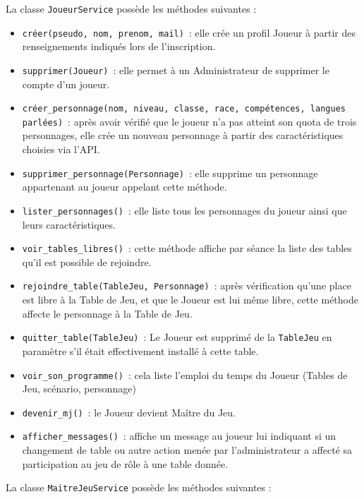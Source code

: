 \documentclass[11pt]{article}
\begin{document}
La classe \texttt{JoueurService} possède les méthodes suivantes :
\begin{itemize}[label=, font=\small]
    \item \texttt{créer(pseudo, nom, prenom, mail)}~: elle crée un profil Joueur à partir des renseignements indiqués lors de l'inscription.
    \item \texttt{supprimer(Joueur)}~: elle permet à un Administrateur de supprimer le compte d'un joueur.
    \item \texttt{créer\_personnage(nom, niveau, classe, race, compétences, langues parlées)}~: après avoir vérifié que le joueur n'a pas atteint son quota de trois personnages, elle crée un nouveau personnage à partir des caractéristiques choisies via l'API.
    \item \texttt{supprimer\_personnage(Personnage)}~: elle supprime un personnage appartenant au joueur appelant cette méthode.
    \item \texttt{lister\_personnages()}~: elle liste tous les personnages du joueur ainsi que leurs caractéristiques.
    \item \texttt{voir\_tables\_libres()}~: cette méthode affiche par séance la liste des tables qu'il est possible de rejoindre.
    \item \texttt{rejoindre\_table(TableJeu, Personnage)}~: après vérification qu'une place est libre à la Table de Jeu, et que le Joueur est lui même libre, cette méthode affecte le personnage à la Table de Jeu.
    \item \texttt{quitter\_table(TableJeu)}~: Le Joueur est supprimé de la \texttt{TableJeu} en paramètre s'il était effectivement installé à cette table.
    \item \texttt{voir\_son\_programme()}~: cela liste l'emploi du temps du Joueur (Tables de Jeu, scénario, personnage)
    \item \texttt{devenir\_mj()}~: le Joueur devient Maître du Jeu.
    \item \texttt{afficher\_messages()}~: affiche un message au joueur lui indiquant si un changement de table ou autre action menée par l'administrateur a affecté sa participation au jeu de rôle à une table donnée.
\end{itemize}


\bigbreak


La classe \texttt{MaitreJeuService} possède les méthodes suivantes :
\end{document}

